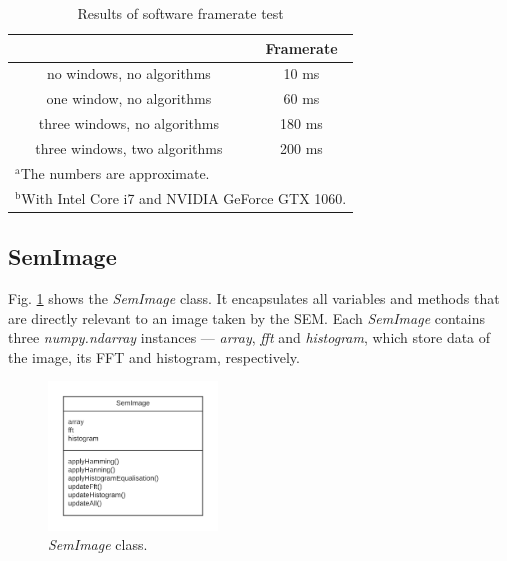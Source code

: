 \documentclass[conference]{IEEEtran}
\begin{document}
\begin{table}[htbp]
    \caption{Results of software framerate test}
    \begin{center}
    \begin{tabular}{|c|c|}
    \hline
     & \textbf{Framerate} \\
    \hline
    no windows, no algorithms & 10 ms \\
    \hline
    one window, no algorithms & 60 ms \\
    \hline
    three windows, no algorithms & 180 ms \\
    \hline
    three windows, two algorithms & 200 ms \\
    \hline
    \multicolumn{2}{l}{$^{\mathrm{a}}$The numbers are approximate.} \\
    \multicolumn{2}{l}{$^{\mathrm{b}}$With Intel Core i7 and NVIDIA GeForce GTX 1060.}
    \end{tabular}
    \label{Software framerates}
    \end{center}
\end{table}

\subsection{SemImage}
Fig. \ref{Software SemImage} shows the \textit{SemImage} class. It encapsulates all variables and methods that are directly relevant to an image taken by the SEM. Each \textit{SemImage} contains three \textit{numpy.ndarray} instances --- \textit{array}, \textit{fft} and \textit{histogram}, which store data of the image, its FFT and histogram, respectively.

\begin{figure}[htbp]
    \centering
    \includegraphics[width=0.4\textwidth]{Images/Software SemImage.png}
    \caption{\textit{SemImage} class.}
    \label{Software SemImage}
\end{figure}
\end{document}
